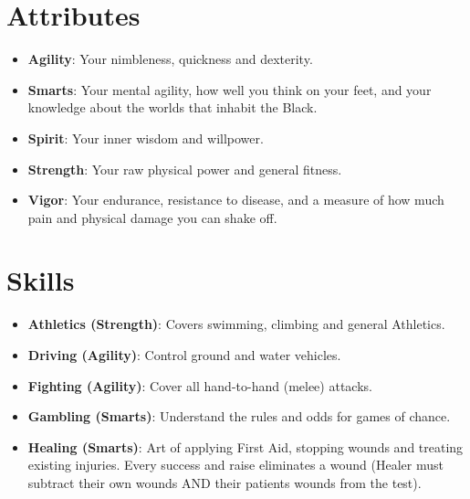 \documentclass[10pt,twoside]{article}
\begin{document}
\begin{multicols}{2}
\section{Attributes}

\begin{itemize}

\item \textbf{Agility}: Your nimbleness, quickness and dexterity.

\item \textbf{Smarts}: Your mental agility, how well you think on your feet, and your knowledge about the worlds that inhabit the Black.

\item \textbf{Spirit}: Your inner wisdom and willpower.

\item \textbf{Strength}: Your raw physical power and general fitness.

\item \textbf{Vigor}: Your endurance, resistance to disease, and a measure of how much pain and physical damage you can shake off.

\end{itemize}


\section{Skills}

\begin{itemize}

\item \textbf{Athletics (Strength)}: Covers swimming, climbing and general Athletics.

\item \textbf{Driving (Agility)}: Control ground and water vehicles.

\item \textbf{Fighting (Agility)}: Cover all hand-to-hand (melee) attacks.

\item \textbf{Gambling (Smarts)}: Understand the rules and odds for games of chance.

\item \textbf{Healing (Smarts)}: Art of applying First Aid, stopping wounds and treating existing injuries. Every success and raise eliminates a wound (Healer must subtract their own wounds AND their patients wounds from the test).


\end{itemize}
\end{multicols}
\end{document}

